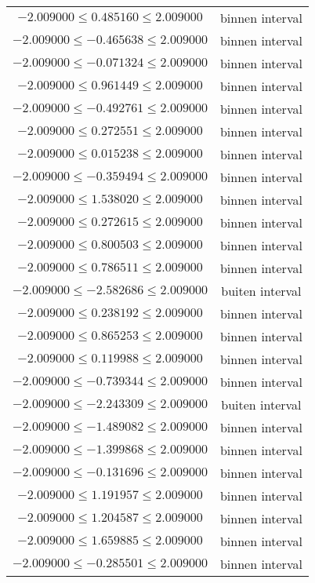 \documentclass{article}
\begin{document}
\begin{longtabu}{cc}
    $-2.009000 \leq 0.485160 \leq 2.009000$ & binnen interval \\
    $-2.009000 \leq -0.465638 \leq 2.009000$ & binnen interval \\
    $-2.009000 \leq -0.071324 \leq 2.009000$ & binnen interval \\
    $-2.009000 \leq 0.961449 \leq 2.009000$ & binnen interval \\
    $-2.009000 \leq -0.492761 \leq 2.009000$ & binnen interval \\
    $-2.009000 \leq 0.272551 \leq 2.009000$ & binnen interval \\
    $-2.009000 \leq 0.015238 \leq 2.009000$ & binnen interval \\
    $-2.009000 \leq -0.359494 \leq 2.009000$ & binnen interval \\
    $-2.009000 \leq 1.538020 \leq 2.009000$ & binnen interval \\
    $-2.009000 \leq 0.272615 \leq 2.009000$ & binnen interval \\
    $-2.009000 \leq 0.800503 \leq 2.009000$ & binnen interval \\
    $-2.009000 \leq 0.786511 \leq 2.009000$ & binnen interval \\
    $-2.009000 \leq -2.582686 \leq 2.009000$ & buiten interval \\
    $-2.009000 \leq 0.238192 \leq 2.009000$ & binnen interval \\
    $-2.009000 \leq 0.865253 \leq 2.009000$ & binnen interval \\
    $-2.009000 \leq 0.119988 \leq 2.009000$ & binnen interval \\
    $-2.009000 \leq -0.739344 \leq 2.009000$ & binnen interval \\
    $-2.009000 \leq -2.243309 \leq 2.009000$ & buiten interval \\
    $-2.009000 \leq -1.489082 \leq 2.009000$ & binnen interval \\
    $-2.009000 \leq -1.399868 \leq 2.009000$ & binnen interval \\
    $-2.009000 \leq -0.131696 \leq 2.009000$ & binnen interval \\
    $-2.009000 \leq 1.191957 \leq 2.009000$ & binnen interval \\
    $-2.009000 \leq 1.204587 \leq 2.009000$ & binnen interval \\
    $-2.009000 \leq 1.659885 \leq 2.009000$ & binnen interval \\
    $-2.009000 \leq -0.285501 \leq 2.009000$ & binnen interval \\

\end{longtabu}
\end{document}
